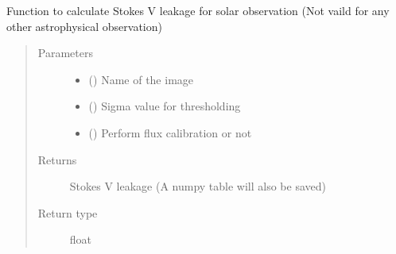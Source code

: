 \documentclass[letterpaper,10pt,english]{sphinxmanual}
\begin{document}
\begin{fulllineitems}

\begin{fulllineitems}
\label{\detokenize{paircars:paircars.fullpol_selfcal_LTS.PolSelfcal.cal_solar_v_leakage}}
\sphinxAtStartPar
Function to calculate Stokes V leakage for solar observation (Not vaild for any other astrophysical observation)
\begin{quote}\begin{description}
\item[{Parameters}] \leavevmode\begin{itemize}
\item {} 
\sphinxAtStartPar
{} () \textendash{} Name of the image

\item {} 
\sphinxAtStartPar
{} () \textendash{} Sigma value for thresholding

\item {} 
\sphinxAtStartPar
{} () \textendash{} Perform flux calibration or not

\end{itemize}

\item[{Returns}] \leavevmode
\sphinxAtStartPar
Stokes V leakage (A numpy table will also be saved)

\item[{Return type}] \leavevmode
\sphinxAtStartPar
float

\end{description}\end{quote}

\end{fulllineitems}



\end{fulllineitems}
\end{document}
